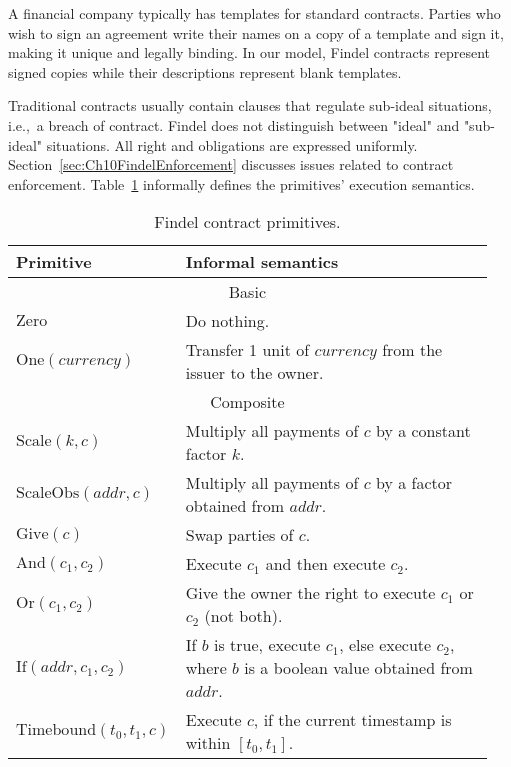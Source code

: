 A financial company typically has templates for standard contracts.
Parties who wish to sign an agreement write their names on a copy of a template and sign it, making it unique and legally binding.
In our model, Findel contracts represent signed copies while their descriptions represent blank templates.

Traditional contracts usually contain clauses that regulate sub-ideal situations, i.e.,~a breach of contract.
Findel does not distinguish between "ideal" and "sub-ideal" situations.
All right and obligations are expressed uniformly.
Section~\ref{sec:Ch10FindelEnforcement} discusses issues related to contract enforcement.
Table~\ref{tab:Ch10FindelSemantics} informally defines the primitives' execution semantics.

\begin{table}
	\centering
	\caption{Findel contract primitives.}
	\begin{tabular}{|p{0.25\linewidth}|p{0.70\linewidth}|}
		\hline
		\textbf{Primitive} & \textbf{Informal semantics} \\
		\hline\hline
		\multicolumn{2}{|c|}{Basic}\\
		\hline
		\(\mathrm{Zero}\) & Do nothing. \\
		\hline
		\(\mathrm{One} (currency)\) & Transfer 1 unit of \(currency\) from the issuer to the owner. \\
		\hline\hline
		\multicolumn{2}{|c|}{Composite}\\
		\hline
		\(\mathrm{Scale} (k, c)\) & Multiply all payments of \(c\) by a constant factor \(k\). \\
		\hline
		\(\mathrm{ScaleObs} (addr, c)\) & Multiply all payments of \(c\) by a factor obtained from \(addr\). \\
		\hline
		\(\mathrm{Give} (c)\) & Swap parties of \(c\). \\
		\hline
		\(\mathrm{And} (c_1, c_2)\) & Execute \(c_1\) and then execute \(c_2\). \\
		\hline
		\(\mathrm{Or} (c_1, c_2)\) & Give the owner the right to execute \(c_1\) or \(c_2\) (not both). \\
		\hline
		\(\mathrm{If} (addr, c_1, c_2)\) & If \(b\) is true, execute \(c_1\), else execute \(c_2\), where \(b\) is a boolean value obtained from \(addr\). \\
		\hline
		\(\mathrm{Timebound} (t_0, t_1, c)\) & Execute \(c\), if the current timestamp is within \([t_0, t_1]\). \\
		\hline
	\end{tabular}
	\label{tab:Ch10FindelSemantics}
\end{table}

